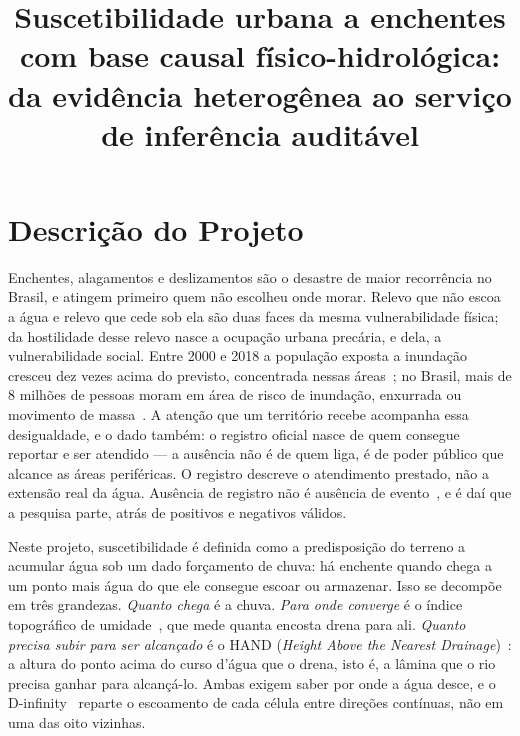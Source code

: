 \documentclass[conference]{IEEEtran}
\begin{document}
\title{Suscetibilidade urbana a enchentes com base causal
físico-hidrológica: da evidência heterogênea ao serviço de inferência
auditável}

\author{
}

\maketitle

\section{Descrição do Projeto}

Enchentes, alagamentos e deslizamentos são o desastre de maior recorrência no
Brasil, e atingem primeiro quem não escolheu onde morar. Relevo que não escoa
a água e relevo que cede sob ela são duas faces da mesma vulnerabilidade
física; da hostilidade desse relevo nasce a ocupação urbana precária, e dela,
a vulnerabilidade social. Entre 2000 e 2018 a população exposta a inundação
cresceu dez vezes acima do previsto, concentrada nessas áreas~\cite{tellman2021};
no Brasil, mais de 8 milhões de pessoas moram em área de risco de inundação,
enxurrada ou movimento de massa~\cite{ibge2018risco}. A atenção que um território recebe acompanha
essa desigualdade, e o dado também: o registro oficial nasce de quem consegue
reportar e ser atendido --- a ausência não é de quem liga, é de poder público que
alcance as áreas periféricas. O registro descreve o atendimento prestado, não a
extensão real da água. Ausência de registro não é ausência de
evento~\cite{li2022pul,agostini2024}, e é daí que a pesquisa parte, atrás de
positivos e negativos válidos.

Neste projeto, suscetibilidade é definida como a predisposição do terreno a
acumular água sob um dado forçamento de chuva: há enchente quando chega a um
ponto mais água do que ele consegue escoar ou armazenar. Isso se decompõe em três grandezas. \emph{Quanto chega} é a chuva. \emph{Para onde
converge} é o índice topográfico de umidade~\cite{beven1979}, que mede quanta
encosta drena para ali. \emph{Quanto precisa subir para ser alcançado} é
o HAND (\emph{Height Above the Nearest Drainage})~\cite{renno2008}: a altura do ponto acima do curso d'água que o drena, isto
é, a lâmina que o rio precisa ganhar para alcançá-lo. Ambas exigem saber por
onde a água desce, e o D-infinity~\cite{tarboton1997} reparte o escoamento de
cada célula entre direções contínuas, não em uma das oito vizinhas.
\end{document}
